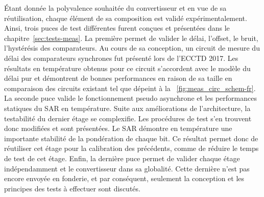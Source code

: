 \begin{mdframed}[linecolor=Prune,linewidth=1]
Étant donnée la polyvalence souhaitée du convertisseur et en vue de sa réutilisation, chaque élément de sa composition est validé expérimentalement. Ainsi, trois puces de test différentes furent conçues et présentées dans le chapitre~\ref{sec:tests-meas}. La première permet de valider le délai, l'offset, le bruit, l’hystérésis des comparateurs. Au cours de sa conception, un circuit de mesure du délai des comparateurs synchrones fut présenté lors de l'ECCTD 2017. Les résultats en température obtenus pour ce circuit s'accordent avec le modèle du délai pur et démontrent de bonnes performances en raison de sa taille en comparaison des circuits existant tel que dépeint à la \figurename~\ref{fig:meas_circ_schem-fr}. La seconde puce valide le fonctionnement pseudo asynchrone et les performances statiques du SAR en température. Suite aux améliorations de l'architecture, la testabilité du dernier étage se complexifie. Les procédures de test s'en trouvent donc modifiées et sont présentées. Le SAR démontre en température une importante stabilité de la pondération de chaque bit. Ce résultat permet donc de réutiliser cet étage pour la calibration des précédents, comme de réduire le temps de test de cet étage. Enfin, la dernière puce permet de valider chaque étage indépendamment et le convertisseur dans sa globalité. Cette dernière n'est pas encore envoyée en fonderie, et par conséquent, seulement la conception et les principes des tests à effectuer sont discutés.


\end{mdframed}
